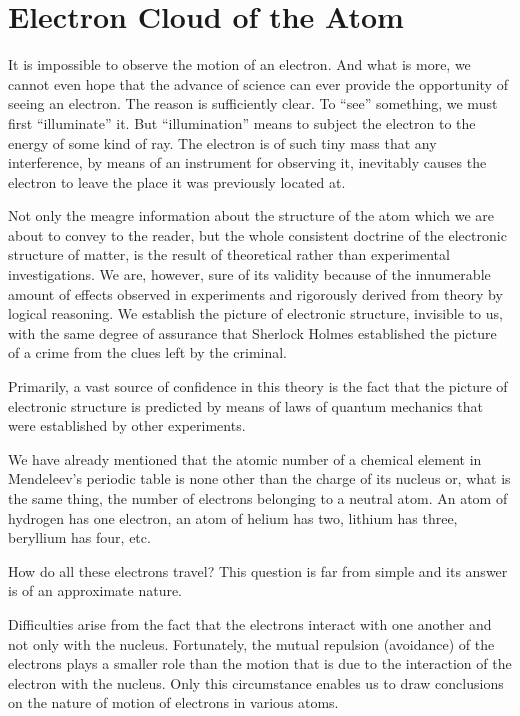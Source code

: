 \section{Electron Cloud of the Atom}

It is impossible to observe the motion of an electron. And what is more, we cannot even hope that the advance of science can ever provide the opportunity of seeing an electron. The reason is sufficiently clear. To ``see'' something, we must first ``illuminate'' it. But ``illumination'' means to subject the electron to the energy of some kind of ray. The electron is of such tiny mass that any interference, by means of an instrument for observing it, inevitably causes the electron to leave the place it was previously located at.

Not only the meagre information about the structure of the atom which we are about to convey to the reader, but the whole consistent doctrine of the electronic structure of matter, is the result of theoretical rather than experimental investigations. We are, however, sure of its validity because of the innumerable amount of effects observed in experiments and rigorously derived from theory by logical reasoning. We establish the picture of electronic structure, invisible to us, with the same degree of assurance that Sherlock Holmes established the picture of a crime from the clues left by the criminal.

Primarily, a vast source of confidence in this theory is the fact that the picture of electronic structure is predicted by means of laws of quantum mechanics that were established by other experiments.

We have already mentioned that the atomic number of a chemical element in Mendeleev's periodic table is none other than the charge of its nucleus or, what is the same thing, the number of electrons belonging to a neutral atom. An atom of hydrogen has one electron, an atom of helium has two, lithium has three, beryllium has four, etc.

How do all these electrons travel? This question is far from simple and its answer is of an approximate nature. 

Difficulties arise from the fact that the electrons interact with one another and not only with the nucleus. Fortunately, the mutual repulsion (avoidance) of the electrons plays a smaller role than the motion that is due to the interaction of the electron with the nucleus. Only this circumstance enables us to draw conclusions on the nature of motion of electrons in various atoms.

